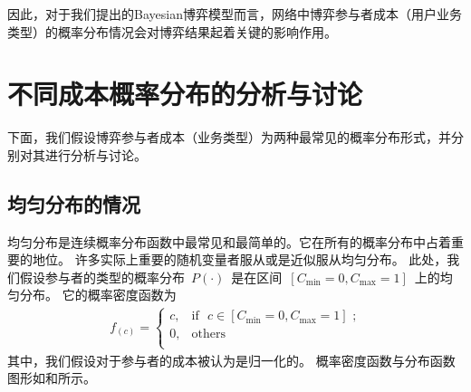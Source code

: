 因此，对于我们提出的Bayesian博弈模型而言，网络中博弈参与者成本（用户业务类型）的概率分布情况会对博弈结果起着关键的影响作用。
\section{不同成本概率分布的分析与讨论}
下面，我们假设博弈参与者成本（业务类型）为两种最常见的概率分布形式，并分别对其进行分析与讨论。
\subsection{均匀分布的情况}
均匀分布是连续概率分布函数中最常见和最简单的。它在所有的概率分布中占着重要的地位。
许多实际上重要的随机变量者服从或是近似服从均匀分布。
此处，我们假设参与者的类型的概率分布~$P(\cdot)$~是在区间~$[C_{\min}=0, C_{\max}=1]$~上的均匀分布。
它的概率密度函数为
\begin{align}
    f_(c) = \begin{cases} c, &\text{if ~$c \in [C_{\min}=0, C_{\max}=1]$~;}\\
        0, &\text{others}\\ 
    \end{cases} 
    \label{eqn_equilibrium_prob} 
\end{align}
其中，我们假设对于参与者的成本被认为是归一化的。
概率密度函数与分布函数图形如和所示。
